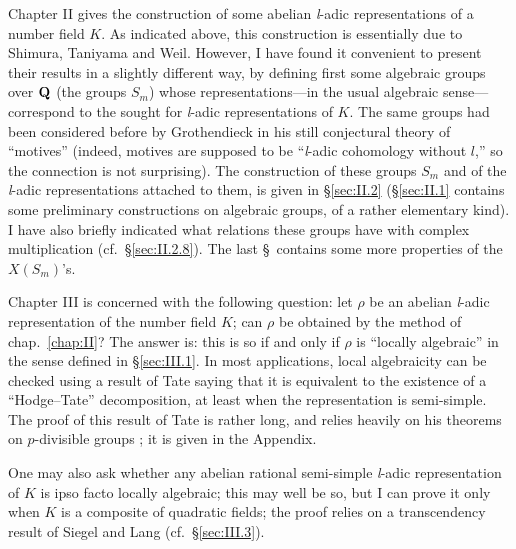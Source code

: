 Chapter II gives the construction of some abelian \textit{l}-adic
representations of a number field $K$. As indicated above, this
construction is essentially due to Shimura, Taniyama and Weil. However, I
have found it convenient to present their results in a slightly different
way, by defining first some algebraic groups over $\mathbf{Q}$ (the groups
$S_m$) whose representations---in the usual algebraic
sense---correspond to the sought for \textit{l}-adic representations of
$K$. The same groups had been considered before by Grothendieck in his
still conjectural theory of ``motives'' (indeed, motives are supposed to
be ``\textit{l}-adic cohomology without $l$,'' so the connection is not
surprising). The construction of these groups $S_m$ and of the
\textit{l}-adic representations attached to them, is given in
\S\ref{sec:II.2} (\S\ref{sec:II.1} contains some preliminary constructions
on algebraic groups, of a rather elementary kind). I have also briefly
indicated what relations these groups have with complex multiplication
(cf.~\S\ref{sec:II.2.8}). The last \S\ contains some more properties of
the $X(S_m)$'s.

Chapter III is concerned with the following question: let $\rho$ be an
abelian \textit{l}-adic representation of the number field $K$; can
$\rho$ be obtained by the method of chap.~\ref{chap:II}? The answer is:
this is so if and only if $\rho$ is ``locally algebraic'' in the sense
defined in \S\ref{sec:III.1}. In most applications, local algebraicity can
be checked using a result of Tate saying that it is equivalent to the
existence of a ``Hodge--Tate'' decomposition, at least when the
representation is semi-simple. The proof of this result of Tate is rather
long, and relies heavily on his theorems on $p$-divisible groups
\cite{tate-pdiv}; it is given in the Appendix.

One may also ask whether any abelian rational semi-simple \textit{l}-adic
representation of $K$ is ipso facto locally algebraic; this may well be
so, but I can prove it only when $K$ is a composite of quadratic fields;
the proof relies on a transcendency result of Siegel and Lang
(cf.~\S\ref{sec:III.3}).

